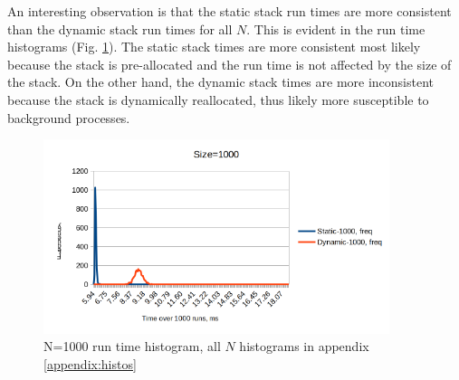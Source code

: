 \documentclass[a4paper,11pt]{article}
\begin{document}
    An interesting observation is that the static stack run times are more consistent than the dynamic stack run times for all $N$. This is evident in the run time histograms (Fig. \ref{fig:histo1000}). The static stack times are more consistent most likely because the stack is pre-allocated and the run time is not affected by the size of the stack. On the other hand, the dynamic stack times are more inconsistent because the stack is dynamically reallocated, thus likely more susceptible to background processes.

    \begin{figure}[H]
        \centering
        \includegraphics[width=0.9\textwidth]{size1000histo.png}
        \caption{N=1000 run time histogram, all $N$ histograms in appendix \ref{appendix:histos}}
        \label{fig:histo1000}
    \end{figure}
\end{document}
